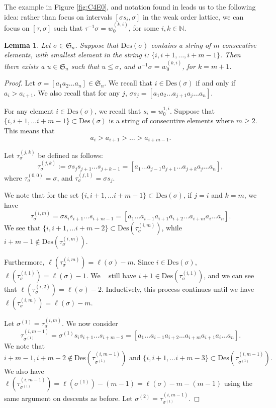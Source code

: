 \documentclass[11pt,reqno]{amsart}
\newtheorem{lemma}[theorem]{Lemma}
\theoremstyle{definition}
\theoremstyle{notation}
\newcommand{\Des}{\text{Des}}
\newcommand{\Sym}{\mathfrak{S}}
\newcommand{\N}{\mathbb{N}}
\begin{document}
The example in Figure \ref{fig:C4E0}, and notation found in  \cite{Tenner_Intervals} leads us to the following idea: rather than focus on intervals $[\sigma s_i, \sigma]$ in the weak order lattice, we can focus on $[\tau, \sigma]$ such that $\tau^{-1}\sigma = w_0^{(k,i)}$, for some $i,k\in \N$.  

\begin{lemma}\label{breakingPerms}
Let $\sigma \in \mathfrak{S}_n$. Suppose that $\Des(\sigma)$ contains a string of $m$ consecutive elements, with smallest element in the string $i$: $\{i,i+1,\ldots, i+m-1\}$. Then there exists a $u\in \Sym_n$ such that $u\leq \sigma$, and $u^{-1}\sigma = w_0^{(k,i)}$, for $k=m+1$.
\end{lemma}

\begin{proof}
Let $\sigma = [a_1 a_2\ldots a_n ] \in \mathfrak{S}_n$. We recall that $i\in \Des(\sigma)$ if and only if $a_i>a_{i+1}$. We also recall that for any $j$, $\sigma s_j = [a_1 a_2\ldots a_{j+1}a_j \ldots a_n]$. 

For any element $i\in \Des(\sigma)$, we recall that $s_i = w_0^{1,i}$. Suppose that $\{i,i+1,\ldots i+m-1 \} \subset \Des(\sigma)$ is a string of consecutive elements where $m\geq 2$. This means that 
\[
a_i>a_{i+1}> \ldots>a_{i+m-1}.
\]


Let $\tau_{\sigma}^{(j,k)}$ be defined as follows: 
\[
\tau_{\sigma}^{(j,k)} := \sigma s_js_{j+1}\ldots s_{j+k-1} = [a_1 \ldots a_{j-1}a_{j+1}\ldots a_{j+k}a_j\ldots a_n],
\]
where $\tau_{\sigma}^{(0,0)}=\sigma$, and  $\tau_{\sigma}^{(j,1)} = \sigma s_j $.

We note that for the set $\{i,i+1,\ldots i+m-1 \} \subset \Des(\sigma)$, if $j=i$ and $k=m$, we have
\[
\tau_{\sigma}^{(i,m)}=\sigma s_is_{i+1}\ldots s_{i+m-1} = [a_1\ldots a_{i-1}a_{i+1}a_{i+2}\ldots a_{i+m}a_i\ldots a_n].
\]
We see that $\{i,i+1,\ldots i+m-2 \} \subset \Des(\tau_{\sigma}^{(i,m)})$, while $i+m-1\notin \Des(\tau_{\sigma}^{(i,m)})$. 

Furthermore, $\ell(\tau_{\sigma}^{(i,m)})= \ell(\sigma) -m$. Since $i\in \Des(\sigma)$, $\ell(\tau_{\sigma}^{(i,1)})=\ell(\sigma)-1$. We ~ still have $i+1\in \Des(\tau_{\sigma}^{(i,1)})$, and we can see that $\ell(\tau_{\sigma}^{(i,2)}) = \ell(\sigma)-2$. Inductively, this process continues until we have $\ell(\tau_{\sigma}^{(i,m)}) = \ell(\sigma)-m$. 

Let $\sigma^{(1)} =\tau_{\sigma}^{(i,m)}$. We now consider 
\[
\tau_{\sigma^{(1)}}^{(i,m-1)}= \sigma^{(1)}s_is_{i+1}\ldots s_{i+m-2}  = [a_1\ldots a_{i-1}a_{i+2}\ldots a_{i+m}a_{i+1}a_i\ldots a_n].
\]
We note that 
\[i+m-1, i+m-2 \notin \Des(\tau_{\sigma^{(1)}}^{(i,m-1)}) \mbox{ and }\{i,i+1,\ldots i+m-3 \} \subset \Des(\tau_{\sigma^{(1)}}^{(i,m-1)}).
\]
We also have $\ell(\tau_{\sigma^{(1)}}^{(i,m-1)}) = \ell(\sigma^{(1)}) - (m-1) = \ell(\sigma) - m -(m-1)$ using the same argument on descents as before. Let $\sigma^{(2)} = \tau_{\sigma^{(1)}}^{(i,m-1)}$.


\end{proof}
\end{document}
